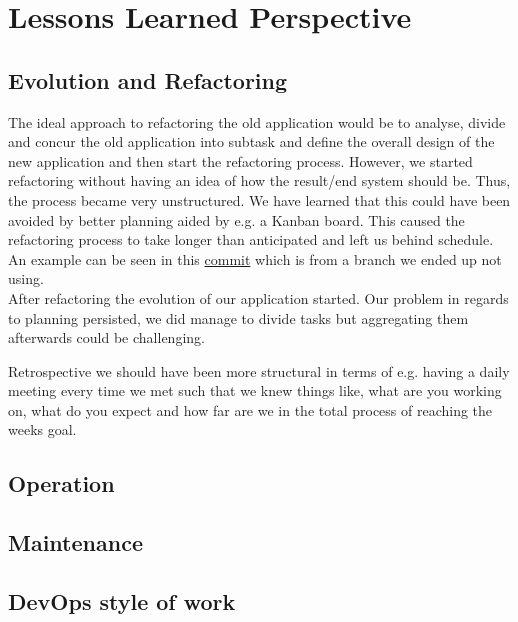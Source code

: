 \section{Lessons Learned Perspective}

\subsection{Evolution and Refactoring}
The ideal approach to refactoring the old application would be to analyse, divide and concur the old application into 
subtask and define the overall design of the new application and then start the refactoring process. However, we started
refactoring without having an idea of how the result/end system should be. Thus, the process became very unstructured. 
We have learned that this could have been avoided by better planning aided by e.g. a Kanban board. This caused the 
refactoring process to take longer than anticipated and left us behind schedule. An example can be seen in this
\href{https://github.com/organizationGB/DevOps/commit/7bbccc97d6d69e90724b00e93e92334210490085}{commit} which is from a 
branch we ended up not using. \\

After refactoring the evolution of our application started. Our problem in regards to planning persisted, we did manage
to divide tasks but aggregating them afterwards could be challenging.  

Retrospective we should have been more structural in terms of e.g. having a daily meeting every time we met such 
that we knew things like, what are you working on, what do you expect and how far are we in the total process of 
reaching the weeks goal.


\subsection{Operation}

\subsection{Maintenance}

\subsection{DevOps style of work}